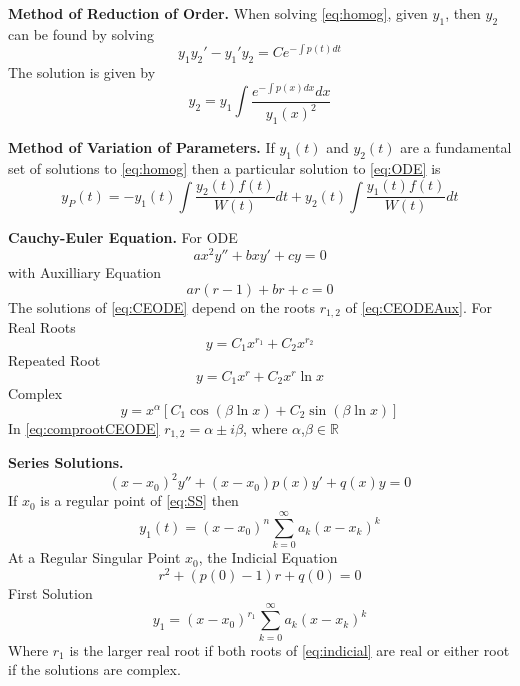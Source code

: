 \documentclass[../main.tex]{subfiles}
\begin{document}
    
    \textbf{Method of Reduction of Order.} When solving \eqref{eq:homog}, given $y_1$, then $y_2$ can be found by solving
    \begin{equation*}
    y_1 y_2' - y_1'y_2 = Ce^{-\int p(t) dt}
    \end{equation*}
    The solution is given by 
    \begin{equation}
    y_2 = y_1\int \dfrac{e^{-\int p(x) dx} dx}{y_1(x)^2}\label{eq:ROE}
    \end{equation}
    
    \textbf{Method of Variation of Parameters.} If $y_1(t)$ and $y_2(t)$ are a fundamental set of solutions to \eqref{eq:homog} then a particular solution to \eqref{eq:ODE} is 
    \begin{equation}
    y_P (t) = -y_1(t) \int \dfrac{y_2(t) f(t)}{W(t)}dt + y_2(t) \int \dfrac{y_1(t) f(t)}{W(t)}dt 
    \end{equation}
    
    \textbf{Cauchy-Euler Equation.} For ODE
    \begin{equation}
        ax^2y''+bxy'+cy=0 \label{eq:CEODE}
    \end{equation}
    with Auxilliary Equation
    \begin{equation}
        ar(r-1)+br+c=0\label{eq:CEODEAux}
    \end{equation}
    The solutions of \eqref{eq:CEODE} depend on the roots $r_{1,2}$ of \eqref{eq:CEODEAux}. For Real Roots
    \begin{equation*}
        y = C_1x^{r_1} + C_2x^{r_2}
    \end{equation*}
    Repeated Root
    \begin{equation*}
        y = C_1 x^r + C_2 x^r \ln x
    \end{equation*}
    Complex
    \begin{equation}
        y=x^{\alpha}[C_1\cos(\beta \ln x) + C_2 \sin (\beta \ln x)] \label{eq:comprootCEODE}
    \end{equation}
    In \eqref{eq:comprootCEODE} $r_{1,2}=\alpha\pm i\beta$, where $\alpha$,$\beta\in\mathds{R}$
    
    \textbf{Series Solutions.} 
    \begin{equation}
    (x-x_0)^2y''+(x-x_0)p(x)y'+q(x)y=0 \label{eq:SS}
    \end{equation}
    If $x_0$ is a regular point of \eqref{eq:SS} then 
    \begin{equation*}
    y_1(t) = (x-x_0)^n\sum_{k=0}^{\infty}a_k(x-x_k)^k
    \end{equation*}
    At a Regular Singular Point $x_0$, the Indicial Equation
    \begin{equation}
        r^2+(p(0)-1)r + q(0)=0 \label{eq:indicial}
    \end{equation}
    First Solution
    \begin{equation*}
        y_1=(x-x_0)^{r_1}\sum_{k=0}^{\infty}a_k(x-x_k)^k
    \end{equation*}
    Where $r_1$ is the larger real root if both roots of \eqref{eq:indicial} are real or either root if the solutions are complex. 
    \clearpage
\end{document}
